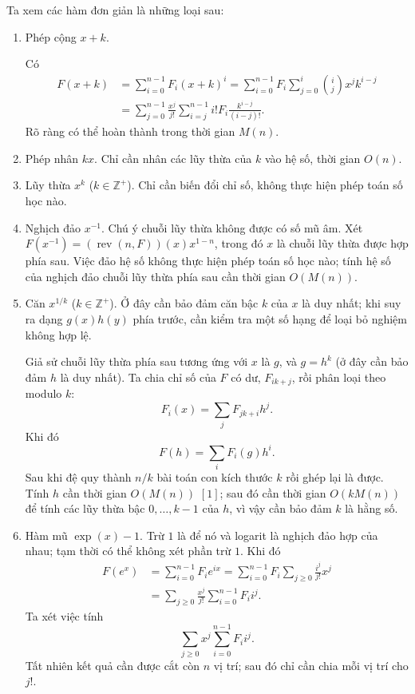 \documentclass[11pt]{article}
\begin{document}
Ta xem các hàm đơn giản là những loại sau:

\begin{enumerate}
  \item Phép cộng \(x+k\).

  Có
  \[
  \begin{aligned}
  F(x+k)
    &=\sum_{i=0}^{n-1}F_i(x+k)^i
      =\sum_{i=0}^{n-1}F_i\sum_{j=0}^i\binom{i}{j}x^jk^{i-j}\\
    &=\sum_{j=0}^{n-1}\frac{x^j}{j!}
      \sum_{i=j}^{n-1} i!F_i\frac{k^{i-j}}{(i-j)!}.
  \end{aligned}
  \]
  Rõ ràng có thể hoàn thành trong thời gian \(M(n)\).

  \item Phép nhân \(kx\). Chỉ cần nhân các lũy thừa của \(k\) vào hệ số, thời
  gian \(O(n)\).

  \item Lũy thừa \(x^k\) (\(k\in\mathbb{Z}^+\)). Chỉ cần biến đổi chỉ số, không
  thực hiện phép toán số học nào.

  \item Nghịch đảo \(x^{-1}\). Chú ý chuỗi lũy thừa không được có số mũ âm. Xét
  \(F(x^{-1})=(\operatorname{rev}(n,F))(x)x^{1-n}\), trong đó \(x\) là chuỗi
  lũy thừa được hợp phía sau. Việc đảo hệ số không thực hiện phép toán số học
  nào; tính hệ số của nghịch đảo chuỗi lũy thừa phía sau cần thời gian
  \(O(M(n))\).

  \item Căn \(x^{1/k}\) (\(k\in\mathbb{Z}^+\)). Ở đây cần bảo đảm căn bậc \(k\)
  của \(x\) là duy nhất; khi suy ra dạng \(g(x)h(y)\) phía trước, cần kiểm tra
  một số hạng để loại bỏ nghiệm không hợp lệ.

  Giả sử chuỗi lũy thừa phía sau tương ứng với \(x\) là \(g\), và \(g=h^k\) (ở
  đây cần bảo đảm \(h\) là duy nhất). Ta chia chỉ số của \(F\) có dư,
  \(F_{ik+j}\), rồi phân loại theo modulo \(k\):
  \[
    F_i(x)=\sum_j F_{jk+i}h^j.
  \]
  Khi đó
  \[
    F(h)=\sum_i F_i(g)h^i.
  \]
  Sau khi đệ quy thành \(n/k\) bài toán con kích thước \(k\) rồi ghép lại là
  được. Tính \(h\) cần thời gian \(O(M(n))\) \([1]\); sau đó cần thời gian
  \(O(kM(n))\) để tính các lũy thừa bậc \(0,\ldots,k-1\) của \(h\), vì vậy cần
  bảo đảm \(k\) là hằng số.

  \item Hàm mũ \(\exp(x)-1\). Trừ \(1\) là để nó và logarit là nghịch đảo hợp
  của nhau; tạm thời có thể không xét phần trừ \(1\). Khi đó
  \[
  \begin{aligned}
  F(e^x)
    &=\sum_{i=0}^{n-1}F_ie^{ix}
      =\sum_{i=0}^{n-1}F_i\sum_{j\ge 0}\frac{i^j}{j!}x^j\\
    &=\sum_{j\ge 0}\frac{x^j}{j!}\sum_{i=0}^{n-1}F_ii^j.
  \end{aligned}
  \]
  Ta xét việc tính
  \[
    \sum_{j\ge 0}x^j\sum_{i=0}^{n-1}F_ii^j.
  \]
  Tất nhiên kết quả cần được cắt còn \(n\) vị trí; sau đó chỉ cần chia mỗi vị
  trí cho \(j!\).


\end{enumerate}
\end{document}
